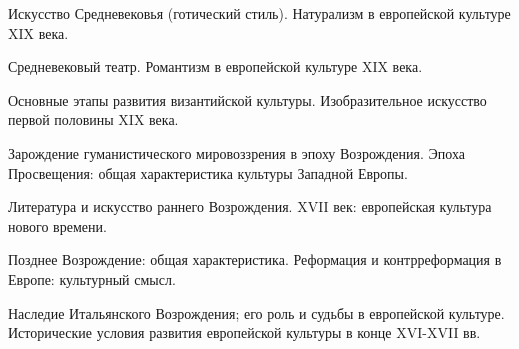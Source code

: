 \documentclass[
	14pt,
	a4paper,
	]
	{scrartcl}
\begin{document}
\vfill

\newpage


\shapk
{}
\setcounter{zad}{0}

\vfill
\z Искусство Средневековья (готический стиль).
 \vfill
\z Натурализм в европейской культуре XIX века.
 \vfill

\vfill

\newpage


\shapk
{}
\setcounter{zad}{0}

\vfill
\z Средневековый театр.
 \vfill
\z Романтизм в европейской культуре XIX века.
 \vfill

\vfill

\newpage


\shapk
{}
\setcounter{zad}{0}

\vfill
\z Основные этапы развития византийской культуры.
 \vfill
\z Изобразительное искусство первой половины XIX века.
 \vfill

\vfill

\newpage


\shapk
{}
\setcounter{zad}{0}

\vfill
\z Зарождение гуманистического мировоззрения в эпоху Возрождения.
 \vfill
\z Эпоха Просвещения: общая характеристика культуры Западной Европы.
 \vfill

\vfill

\newpage


\shapk
{}
\setcounter{zad}{0}

\vfill
\z Литература и искусство раннего Возрождения.
 \vfill
\z XVII век: европейская культура нового времени.
 \vfill

\vfill

\newpage


\shapk
{}
\setcounter{zad}{0}

\vfill
\z Позднее Возрождение: общая характеристика.
 \vfill
\z Реформация и контрреформация в Европе: культурный смысл.
 \vfill

\vfill

\newpage


\shapk
{}
\setcounter{zad}{0}

\vfill
\z Наследие Итальянского Возрождения; его роль и судьбы в европейской культуре.
 \vfill
\z Исторические условия развития европейской культуры в конце XVI-XVII вв.
 \vfill

\vfill

\newpage
\end{document}
